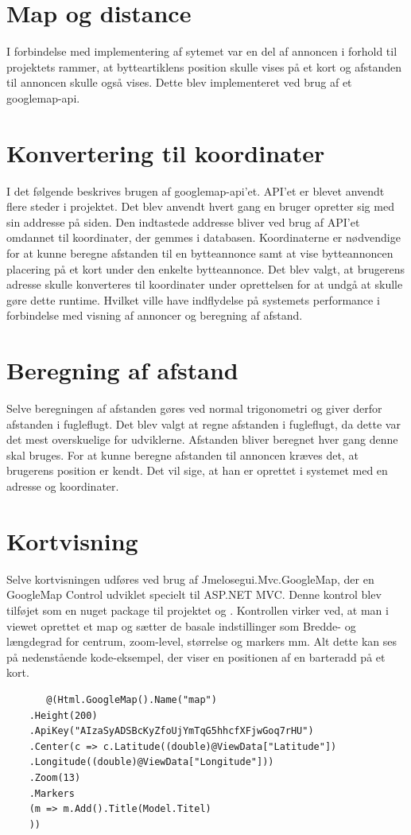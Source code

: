 \section{Map og distance}
I forbindelse med implementering af sytemet var en del af annoncen i forhold til projektets rammer, at bytteartiklens position skulle vises på et kort og afstanden til annoncen skulle også vises. Dette blev implementeret ved brug af et googlemap-api.
\section{Konvertering til koordinater}
I det følgende beskrives brugen af googlemap-api'et. API'et er blevet anvendt flere steder i projektet. Det blev anvendt hvert gang en bruger opretter sig med sin addresse på siden. Den indtastede addresse bliver ved brug af API'et omdannet til koordinater, der gemmes i databasen. Koordinaterne er nødvendige for at kunne beregne afstanden til en bytteannonce samt at vise bytteannoncen placering på et kort under den enkelte bytteannonce.
Det blev valgt, at brugerens adresse skulle konverteres til koordinater under oprettelsen for at undgå at skulle gøre dette runtime. Hvilket ville have indflydelse på systemets performance i forbindelse med visning af annoncer og beregning af afstand.

\section{Beregning af afstand}
Selve beregningen af afstanden gøres ved normal trigonometri og giver derfor afstanden i fugleflugt. Det blev valgt at regne afstanden i fugleflugt, da dette var det mest overskuelige for udviklerne. Afstanden bliver beregnet hver gang denne skal bruges. For at kunne beregne afstanden til annoncen kræves det, at brugerens position er kendt. Det vil sige, at han er oprettet i systemet med en adresse og koordinater.


\section{Kortvisning}
Selve kortvisningen udføres ved brug af Jmelosegui.Mvc.GoogleMap, der en GoogleMap Control udviklet specielt til ASP.NET MVC. Denne kontrol blev tilføjet som en nuget package til projektet og . Kontrollen virker ved, at man i viewet oprettet et map og sætter de basale indstillinger som Bredde- og længdegrad for centrum, zoom-level, størrelse og markers mm.
Alt dette kan ses på nedenstående kode-eksempel, der viser en positionen af en barteradd på et kort.
\begin{verbatim}
	   @(Html.GoogleMap().Name("map")
	.Height(200)
	.ApiKey("AIzaSyADSBcKyZfoUjYmTqG5hhcfXFjwGoq7rHU")
	.Center(c => c.Latitude((double)@ViewData["Latitude"])
	.Longitude((double)@ViewData["Longitude"]))
	.Zoom(13)
	.Markers
	(m => m.Add().Title(Model.Titel)
	))
\end{verbatim}

